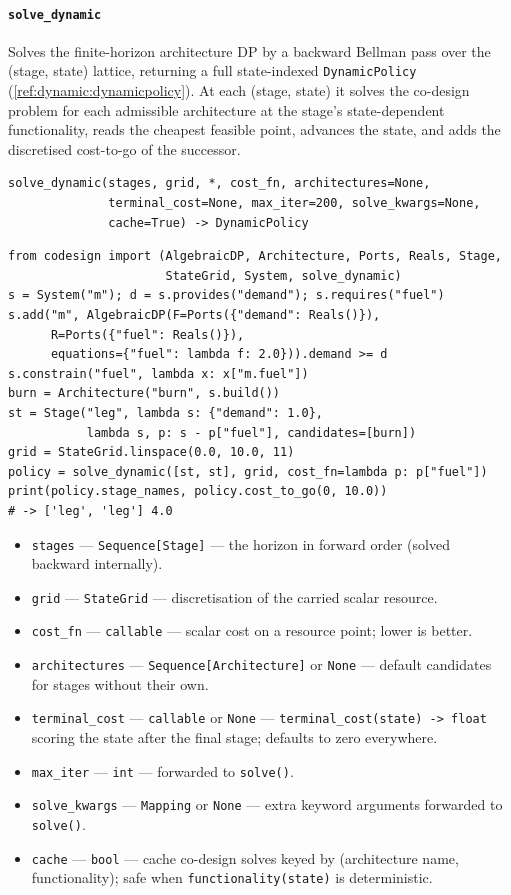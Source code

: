 \documentclass[11pt,a4paper]{article}
\begin{document}
\paragraph{\texttt{solve\_dynamic}}\label{ref:dynamic:solve_dynamic}
Solves the finite-horizon architecture DP by a backward Bellman pass over
the (stage, state) lattice, returning a full state-indexed
\texttt{DynamicPolicy} (\ref{ref:dynamic:dynamicpolicy}). At each (stage,
state) it solves the co-design problem for each admissible architecture at
the stage's state-dependent functionality, reads the cheapest feasible
point, advances the state, and adds the discretised cost-to-go of the
successor.
\begin{lstlisting}
solve_dynamic(stages, grid, *, cost_fn, architectures=None,
              terminal_cost=None, max_iter=200, solve_kwargs=None,
              cache=True) -> DynamicPolicy
\end{lstlisting}
\begin{lstlisting}
from codesign import (AlgebraicDP, Architecture, Ports, Reals, Stage,
                      StateGrid, System, solve_dynamic)
s = System("m"); d = s.provides("demand"); s.requires("fuel")
s.add("m", AlgebraicDP(F=Ports({"demand": Reals()}),
      R=Ports({"fuel": Reals()}),
      equations={"fuel": lambda f: 2.0})).demand >= d
s.constrain("fuel", lambda x: x["m.fuel"])
burn = Architecture("burn", s.build())
st = Stage("leg", lambda s: {"demand": 1.0},
           lambda s, p: s - p["fuel"], candidates=[burn])
grid = StateGrid.linspace(0.0, 10.0, 11)
policy = solve_dynamic([st, st], grid, cost_fn=lambda p: p["fuel"])
print(policy.stage_names, policy.cost_to_go(0, 10.0))
# -> ['leg', 'leg'] 4.0
\end{lstlisting}
\begin{itemize}[nosep]
  \item \texttt{stages} --- \texttt{Sequence[Stage]} --- the horizon in
    forward order (solved backward internally).
  \item \texttt{grid} --- \texttt{StateGrid} --- discretisation of the
    carried scalar resource.
  \item \texttt{cost\_fn} --- \texttt{callable} --- scalar cost on a
    resource point; lower is better.
  \item \texttt{architectures} --- \texttt{Sequence[Architecture]} or
    \texttt{None} --- default candidates for stages without their own.
  \item \texttt{terminal\_cost} --- \texttt{callable} or \texttt{None} ---
    \texttt{terminal\_cost(state) -> float} scoring the state after the
    final stage; defaults to zero everywhere.
  \item \texttt{max\_iter} --- \texttt{int} --- forwarded to
    \texttt{solve()}.
  \item \texttt{solve\_kwargs} --- \texttt{Mapping} or \texttt{None} ---
    extra keyword arguments forwarded to \texttt{solve()}.
  \item \texttt{cache} --- \texttt{bool} --- cache co-design solves keyed by
    (architecture name, functionality); safe when
    \texttt{functionality(state)} is deterministic.
\end{itemize}
\end{document}
